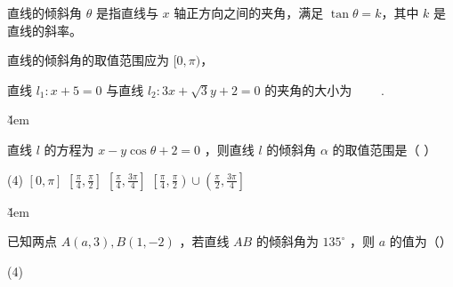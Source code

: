 \begin{definition}[直线的倾斜角]
    直线的倾斜角 $\theta$ 是指直线与 $x$ 轴正方向之间的夹角，满足 $\tan \theta = k$，其中 $k$ 是直线的斜率。

    \begin{center}
    \end{center}

    \begin{tips}
        直线的倾斜角的取值范围应为 $[0, \pi)$，
    \end{tips}
\end{definition}

\begin{example}
    直线 $l_1: x+5=0$ 与直线 $l_2: 3 x+\sqrt{3} y+2=0$ 的夹角的大小为 \underline{$\qquad$}.
\end{example}

\v{4em}

\begin{example}
    直线 $l$ 的方程为 $x-y \cos \theta+2=0$ ，则直线 $l$ 的倾斜角 $\alpha$ 的取值范围是（ \quad）
    \begin{tasks}(4)
        \task $[0, \pi]$
        \task $\left[\frac{\pi}{4}, \frac{\pi}{2}\right]$
        \task $\left[\frac{\pi}{4}, \frac{3 \pi}{4}\right]$
        \task $\left[\frac{\pi}{4}, \frac{\pi}{2}\right) \cup\left(\frac{\pi}{2}, \frac{3 \pi}{4}\right]$
    \end{tasks}
\end{example}

\v{4em}

\begin{example}
    已知两点 $A(a, 3), B(1,-2)$ ，若直线 $A B$ 的倾斜角为 $135^{\circ}$ ，则 $a$ 的值为（\quad）
    \begin{tasks}(4)
    \end{tasks}
\end{example}

\vspace{2em}

